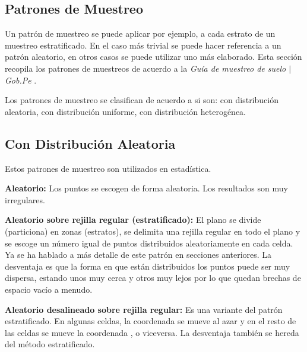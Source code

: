 %
%

\subsection{Patrones de Muestreo}

Un patrón de muestreo se puede aplicar por ejemplo, a cada estrato de un muestreo estratificado. En el caso más trivial se puede hacer referencia a un patrón aleatorio, en otros casos se puede utilizar uno más elaborado. Esta sección recopila los patrones de muestreos de acuerdo a la \textit{Guía de muestreo de suelo $\mid$ Gob.Pe} \cite{gobpe-ministerio-del-ambiente-2014}.

\bigbreak

Los patrones de muestreo se clasifican de acuerdo a si son:  con distribución aleatoria, con distribución uniforme, con distribución heterogénea.

\subsection{Con Distribución Aleatoria}

Estos patrones de muestreo son utilizados en estadística.

\bigbreak

\textbf{Aleatorio:} Los puntos se escogen de forma aleatoria. Los resultados son muy irregulares.

\bigbreak

\textbf{Aleatorio sobre rejilla regular (estratificado):} El plano se divide (particiona) en zonas (estratos), se delimita una rejilla regular en todo el plano y se escoge un número igual de puntos distribuidos aleatoriamente en cada celda. Ya se ha hablado a más detalle de este patrón en secciones anteriores. La desventaja es que la forma en que están distribuidos los puntos puede ser muy dispersa, estando unos muy cerca y otros muy lejos por lo que quedan brechas de espacio vacío a menudo.

\bigbreak

\textbf{Aleatorio desalineado sobre rejilla regular:} Es una variante del patrón estratificado. En algunas celdas, la coordenada  se mueve al azar y en el resto de las celdas se mueve la coordenada , o viceversa. La desventaja también se hereda del método estratificado.

